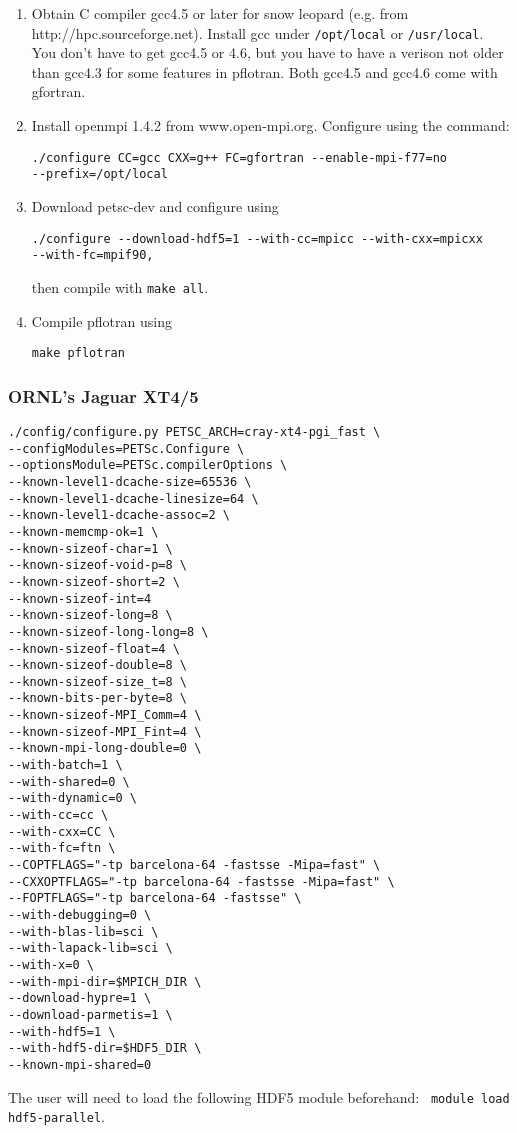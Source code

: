 \documentclass[12pt]{article}
\begin{document}
\begin{enumerate}
\item Obtain C compiler gcc4.5 or later for snow leopard (e.g. from http://hpc.sourceforge.net). 
Install gcc under \verb|/opt/local| or \verb|/usr/local|. 
You don't have to get gcc4.5 or 4.6,
but you have to have a verison not older than gcc4.3 for some features in
pflotran. Both gcc4.5 and gcc4.6 come with gfortran.

\item Install openmpi 1.4.2 from www.open-mpi.org. Configure using the command:

\begin{verbatim}
./configure CC=gcc CXX=g++ FC=gfortran --enable-mpi-f77=no 
--prefix=/opt/local
\end{verbatim}

\item Download petsc-dev and configure using

\begin{verbatim}
./configure --download-hdf5=1 --with-cc=mpicc --with-cxx=mpicxx 
--with-fc=mpif90,
\end{verbatim}

then compile with \verb|make all|.

\item Compile pflotran using

\verb|make pflotran|
\end{enumerate}

\subsubsection{ORNL's Jaguar XT4/5}

\footnotesize
\begin{verbatim}
./config/configure.py PETSC_ARCH=cray-xt4-pgi_fast \
--configModules=PETSc.Configure \
--optionsModule=PETSc.compilerOptions \
--known-level1-dcache-size=65536 \
--known-level1-dcache-linesize=64 \
--known-level1-dcache-assoc=2 \
--known-memcmp-ok=1 \
--known-sizeof-char=1 \
--known-sizeof-void-p=8 \
--known-sizeof-short=2 \
--known-sizeof-int=4
--known-sizeof-long=8 \
--known-sizeof-long-long=8 \
--known-sizeof-float=4 \
--known-sizeof-double=8 \
--known-sizeof-size_t=8 \
--known-bits-per-byte=8 \
--known-sizeof-MPI_Comm=4 \
--known-sizeof-MPI_Fint=4 \
--known-mpi-long-double=0 \
--with-batch=1 \
--with-shared=0 \
--with-dynamic=0 \
--with-cc=cc \
--with-cxx=CC \
--with-fc=ftn \
--COPTFLAGS="-tp barcelona-64 -fastsse -Mipa=fast" \
--CXXOPTFLAGS="-tp barcelona-64 -fastsse -Mipa=fast" \
--FOPTFLAGS="-tp barcelona-64 -fastsse" \
--with-debugging=0 \
--with-blas-lib=sci \
--with-lapack-lib=sci \
--with-x=0 \
--with-mpi-dir=$MPICH_DIR \
--download-hypre=1 \
--download-parmetis=1 \
--with-hdf5=1 \
--with-hdf5-dir=$HDF5_DIR \
--known-mpi-shared=0
\end{verbatim}
\normalsize
The user will need to load the following HDF5 module beforehand: \ \verb|module load hdf5-parallel|.
\end{document}
